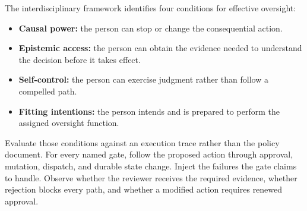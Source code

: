 The interdisciplinary framework identifies four conditions for effective oversight:

\begin{itemize}
\tightlist
\item
  \textbf{Causal power:} the person can stop or change the consequential action.
\item
  \textbf{Epistemic access:} the person can obtain the evidence needed to understand the decision before it takes effect.
\item
  \textbf{Self-control:} the person can exercise judgment rather than follow a compelled path.
\item
  \textbf{Fitting intentions:} the person intends and is prepared to perform the assigned oversight function.
\end{itemize}

Evaluate those conditions against an execution trace rather than the policy document. For every named gate, follow the proposed action through approval, mutation, dispatch, and durable state change. Inject the failures the gate claims to handle. Observe whether the reviewer receives the required evidence, whether rejection blocks every path, and whether a modified action requires renewed approval.

